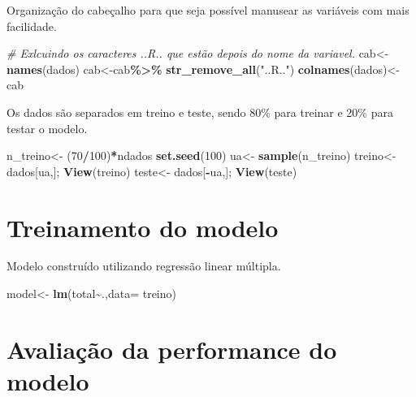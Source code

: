 \documentclass[
]{article}
\newenvironment{Shaded}{\begin{snugshade}}{\end{snugshade}}
\newcommand{\CommentTok}[1]{\textcolor[rgb]{0.56,0.35,0.01}{\textit{#1}}}
\newcommand{\DataTypeTok}[1]{\textcolor[rgb]{0.13,0.29,0.53}{#1}}
\newcommand{\DecValTok}[1]{\textcolor[rgb]{0.00,0.00,0.81}{#1}}
\newcommand{\KeywordTok}[1]{\textcolor[rgb]{0.13,0.29,0.53}{\textbf{#1}}}
\newcommand{\NormalTok}[1]{#1}
\newcommand{\OperatorTok}[1]{\textcolor[rgb]{0.81,0.36,0.00}{\textbf{#1}}}
\newcommand{\StringTok}[1]{\textcolor[rgb]{0.31,0.60,0.02}{#1}}
\begin{document}
Organização do cabeçalho para que seja possível manusear as variáveis
com mais facilidade.

\begin{Shaded}
\begin{Highlighting}[]
\CommentTok{\# Exlcuindo os caracteres ..R.. que estão depois do nome da variavel.}
\NormalTok{cab\textless{}{-}}\KeywordTok{names}\NormalTok{(dados)}
\NormalTok{cab\textless{}{-}cab}\OperatorTok{\%\textgreater{}\%}\StringTok{ }\KeywordTok{str\_remove\_all}\NormalTok{(}\StringTok{"..R.."}\NormalTok{)}
\KeywordTok{colnames}\NormalTok{(dados)\textless{}{-}}\StringTok{ }\NormalTok{cab}
\end{Highlighting}
\end{Shaded}

Os dados são separados em treino e teste, sendo 80\% para treinar e 20\%
para testar o modelo.

\begin{Shaded}
\begin{Highlighting}[]
\NormalTok{n\_treino\textless{}{-}}\StringTok{ }\NormalTok{(}\DecValTok{70}\OperatorTok{/}\DecValTok{100}\NormalTok{)}\OperatorTok{*}\NormalTok{ndados}
\KeywordTok{set.seed}\NormalTok{(}\DecValTok{100}\NormalTok{)}
\NormalTok{ua\textless{}{-}}\StringTok{ }\KeywordTok{sample}\NormalTok{(n\_treino)}
\NormalTok{treino\textless{}{-}}\StringTok{ }\NormalTok{dados[ua,]; }\KeywordTok{View}\NormalTok{(treino)}
\NormalTok{teste\textless{}{-}}\StringTok{ }\NormalTok{dados[}\OperatorTok{{-}}\NormalTok{ua,]; }\KeywordTok{View}\NormalTok{(teste)}
\end{Highlighting}
\end{Shaded}

\hypertarget{treinamento-do-modelo}{%
\section{Treinamento do modelo}\label{treinamento-do-modelo}}

Modelo construído utilizando regressão linear múltipla.

\begin{Shaded}
\begin{Highlighting}[]
\NormalTok{model\textless{}{-}}\StringTok{ }\KeywordTok{lm}\NormalTok{(total}\OperatorTok{\textasciitilde{}}\NormalTok{.,}\DataTypeTok{data=}\NormalTok{ treino)}
\end{Highlighting}
\end{Shaded}

\hypertarget{avaliauxe7uxe3o-da-performance-do-modelo}{%
\section{Avaliação da performance do
modelo}\label{avaliauxe7uxe3o-da-performance-do-modelo}}
\end{document}
